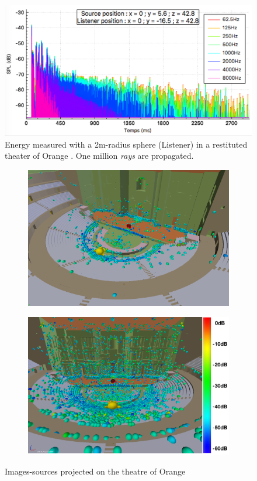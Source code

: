 \documentclass[AMA,STIX1COL]{WileyNJD-v2}
\begin{document}
\begin{figure}[t]
\centering
\includegraphics[width=0.6\linewidth]{rirTheatreAvecDecor}
\caption{Energy measured with a 2m-radius sphere (Listener) in a restituted theater of Orange \cite{theseRobin}. One million \textit{rays} are propagated.}
\label{rirTheatreAvecDecor}
\end{figure}


\begin{figure}[t]
\centering
	\begin{subfigure}{0.49\textwidth}
		\includegraphics[width=\linewidth]{SIsansDec}
		\caption{}	
	\end{subfigure}
	\begin{subfigure}{0.49\textwidth}
		\includegraphics[width=\linewidth]{SI60dB}
		\caption{}
	\end{subfigure}
	\caption{Images-sources projected on the theatre of Orange}
	\label{SItheater}
\end{figure}
\end{document}
